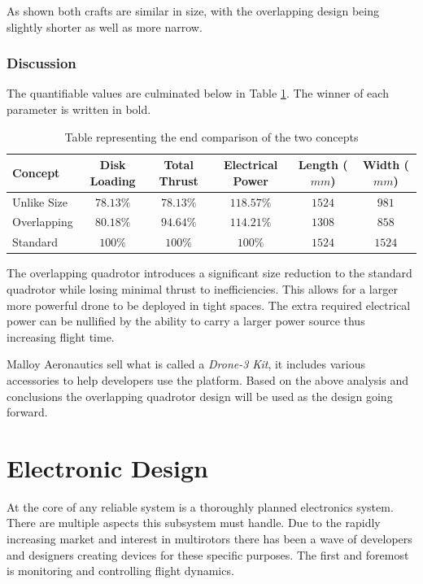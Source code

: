 			As shown both crafts are similar in size, with the overlapping design being slightly shorter as well as more narrow.
			
			\subsubsection{Discussion}
			The quantifiable values are culminated below in Table \ref{TAB_ConceptComparison}. The winner of each parameter is written in bold.
			
			\begin{table}[H]
				\centering
				\begin{tabular}{l | c | c | c | c | c }
					Concept & Disk Loading & Total Thrust & Electrical Power & Length ($mm$)& Width ($mm$) \\
					\hline\hline
					Unlike Size	  & \boldmath$78.13\%$  & $78.13\%$ 	& $118.57\%$	& $1524$ & $981$ \\
					Overlapping    & $80.18\%$ & \boldmath$94.64\%$  & \boldmath$114.21\%$	& \boldmath$1308$ & \boldmath$858$ \\
					\hline\hline
					Standard		& $100\%$ 	& $100\%$  	  & $100\%$			& $1524$ & $1524$\\
				\end{tabular}
				\label{TAB_ConceptComparison}
				\caption{Table representing the end comparison of the two concepts}
			\end{table}
			
			The overlapping quadrotor introduces a significant size reduction to the standard quadrotor while losing minimal thrust to inefficiencies. This allows for a larger more powerful drone to be deployed in tight spaces. The extra required electrical power can be nullified by the ability to carry a larger power source thus increasing flight time.
			
			Malloy Aeronautics sell what is called a \textit{Drone-3 Kit}, it includes various accessories to help developers use the platform.	Based on the above analysis and conclusions the overlapping quadrotor design will be used as the design going forward.

	\section{Electronic Design}
	At the core of any reliable system is a thoroughly planned electronics system. There are multiple aspects this subsystem must handle. Due to the rapidly increasing market and interest in multirotors there has been a wave of developers and designers creating devices for these specific purposes. The first and foremost is monitoring and controlling flight dynamics.	
	
